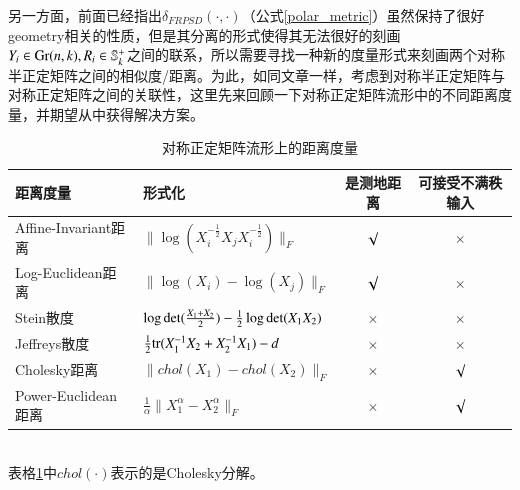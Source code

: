 另一方面，前面已经指出$\delta_{FRPSD}(\cdot,\cdot)$（公式\ref{polar_metric}）虽然保持了很好geometry相关的性质，但是其分离的形式使得其无法很好的刻画$Y_{i}\in {\rm Gr}(n,k),R_{i} \in \mathbb{S}_{k}^{+}$之间的联系，所以需要寻找一种新的度量形式来刻画两个对称半正定矩阵之间的相似度/距离。为此，如同文章\cite{PSD_Riemannian}一样，考虑到对称半正定矩阵与对称正定矩阵之间的关联性，这里先来回顾一下对称正定矩阵流形中的不同距离度量，并期望从中获得解决方案。
\begin{table}[htb]
	\centering
	\caption{对称正定矩阵流形上的距离度量}
	\begin{tabular}{llcc}
	\toprule[1.5pt]
		{\heiti 距离度量} &{\heiti 形式化} &{\heiti 是测地距离} &{\heiti 可接受不满秩输入}\\ \hline
		Affine-Invariant距离\cite{AIM_metric} &$\|\log(X_{i}^{-\frac{1}{2}}X_jX_{i}^{-\frac{1}{2}})\|_F$ &$\surd$ &$\times$ \\
		Log-Euclidean距离\cite{LEM_metric} &$\|\log(X_{i})-\log(X_{j})\|_F$ &$\surd$ &$\times$ \\
		Stein散度\cite{Stein_divergence} &$\log{\rm det}(\frac{X_1+X_2}{2})-\frac{1}{2}\log{\rm det}(X_1X_2)$ &$\times$ &$\times$ \\
		Jeffreys散度\cite{Jeffreys_divergence} &$\frac{1}{2}{\rm tr}(X_{1}^{-1}X_2+X_{2}^{-1}X_{1})-d$ &$\times$ &$\times$\\
		Cholesky距离\cite{Cholesky_distance} &$\|chol(X_1)-chol(X_2)\|_{F}$ &$\times$ &$\surd$\\
		Power-Euclidean距离\cite{Cholesky_distance} & $\frac{1}{\alpha}\|X_{1}^{\alpha}-X_{2}^{\alpha}\|_{F}$ &$\times$ &$\surd$\\
	\bottomrule[1.5pt]
	\end{tabular}
	\label{tab:SPD_metric_list}
\end{table}\\
表格\ref{tab:SPD_metric_list}中$chol(\cdot)$表示的是Cholesky分解。

